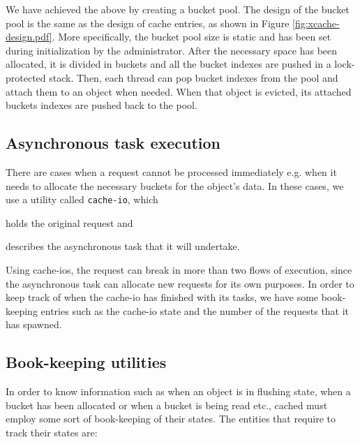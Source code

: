 We have achieved the above by creating a bucket pool. The design of the bucket 
pool is the same as the design of cache entries, as shown in Figure 
\ref{fig:xcache-design.pdf}. More specifically, the bucket pool size is static 
and has been set during initialization by the administrator. After the 
necessary space has been allocated, it is divided in buckets and all the bucket 
indexes are pushed in a lock-protected stack. Then, each thread can pop bucket 
indexes from the pool and attach them to an object when needed. When that 
object is evicted, its attached buckets indexes are pushed back to the pool.

\subsection{Asynchronous task execution}

There are cases when a request cannot be processed immediately e.g. when it 
needs to allocate the necessary buckets for the object's data. In these cases, 
we use a utility called \texttt{cache-io}, which
\begin{inparaenum}[i)]
\item holds the original request and
\item describes the asynchronous task that it will undertake.
\end{inparaenum}

Using cache-ios, the request can break in more than two flows of execution, 
since the asynchronous task can allocate new requests for its own purposes.  In 
order to keep track of when the cache-io has finished with its tasks, we have
some book-keeping entries such as the cache-io state and the number of the 
requests that it has spawned.

\subsection{Book-keeping utilities}\label{sec:cached-states-design}

In order to know information such as when an object is in flushing state, when 
a bucket has been allocated or when a bucket is being read etc., cached must 
employ some sort of book-keeping of their states. The entities that require to 
track their states are:

